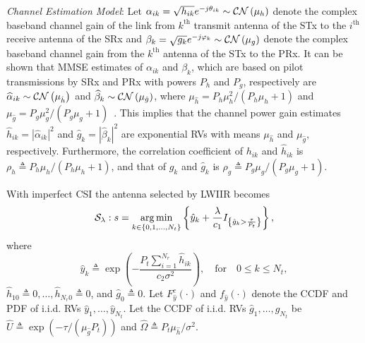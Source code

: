 \documentclass[12pt,draftcls,peerreview,onecolumn]{IEEEtran}
\newcommand{\cbrac}[1]{\left\{{#1}\right\}}
\newcommand{\indic}[1]{I_{\cbrac{#1}}}
\newcommand{\CN}{{\cal CN}}
\newcommand{\define}{\triangleq}
\DeclareMathOperator*{\argmin}{arg\,min}
\newcommand{\nx}{{0}}
\newcommand{\lam}{\lambda}
\newcommand{\lamstar}{\lam^{*}}
\newcommand{\mug}{{\mu_{g}}}
\newcommand{\muh}{{\mu_{h}}}
\newcommand{\Nt}{{N_t}}
\newcommand{\Nr}{{N_r}}
\newcommand{\Pt}{{P_t}}
\newcommand{\such}{h}
\newcommand{\puch}{g}
\newcommand{\hk}[1]{{\such_{#1}}}
\newcommand{\gk}[1]{{\puch_{#1}}}
\newcommand{\noisevar}{\sigma^2}
\newcommand{\outmax}{O_{\text{max}}}
\newcommand{\itau}{\tau}
\newcommand{\cone}{c_{1}}
\newcommand{\ctwo}{c_{2}}
\newcommand{\out}{O}
\newcommand{\m}{\cone}
\newcommand{\taubypt}{\frac{\itau}{\Pt}}
\newcommand{\gkhatgrtaubypt}[1]{{\gkhat{#1}}>\taubypt}
\newcommand{\ghatindic}[1]{\indic{\gkhatgrtaubypt{#1}}}
\newcommand{\lambym}{\frac{\lam}{\m}}
\newcommand{\lamstarbym}{\frac{\lamstar}{\m}}
\newcommand{\ykhatplusgkhat}[1]{ \ykhat{#1} + \lambym\ghatindic{#1}}
\newcommand{\al}{\ctwo}
\newcommand{\snr}{\Omega}
\newcommand{\albysnr}[1][]{\frac{\al#1}{\snr}}
\newcommand{\un}{U}
\newcommand{\allopts}{\left\{\nx,1,\ldots,\Nt\right\}}
\newcommand{\suchph}{\theta}
\newcommand{\puchph}{\varphi}
\newcommand{\ith}{i^{\text{th}}}
\newcommand{\kth}{k^{\text{th}}}
\newcommand{\callamrule}{{\cal S_{{\lam}}}}
\newcommand{\outlam}{\out_{\lam}}
\newcommand{\sug}{\alpha}
\newcommand{\pug}{\beta}
\newcommand{\sugain}[1]{\sug_{#1}}
\newcommand{\pugain}[1]{\pug_{#1}}
\newcommand{\sugainhat}[1]{\widehat{\sug}_{#1}}
\newcommand{\pugainhat}[1]{\widehat{\pug}_{#1}}
\newcommand{\unhat}{\widehat{\un}}
\newcommand{\snrhat}{\widehat{\snr}}
\newcommand{\gpilotpower}{P_g}
\newcommand{\hpilotpower}{P_h}
\newcommand{\hhat}{\hat{\such}}
\newcommand{\ghat}{\hat{\puch}}
\newcommand{\yhat}{\hat{y}}
\newcommand{\hkhat}[1]{\hhat_{#1}}
\newcommand{\gkhat}[1]{\ghat_{#1}}
\newcommand{\ykhat}[1]{\hat{y}_{#1}}
\newcommand{\muhhat}{\mu_{\hhat}}
\newcommand{\mughat}{\mu_{\ghat}}
\newcommand{\ccdfghatinline}{\exp\left( {-{\itau}/{\left( \mughat\Pt\right) }}\right) }
\newcommand{\rhog}{\rho_g}
\newcommand{\rhoh}{\rho_h}
\newcommand{\ccdfyhatrv}[1]{F^{c}_{\yhat}\left(#1 \right) }
\begin{document}
{\em Channel Estimation Model}: Let $\sugain{ik} = \sqrt{\hk{ik}}e^{-j\suchph_{ik}}\sim\CN\left(\muh\right) $ denote the complex baseband channel gain of the link from $\kth$ transmit antenna of the STx to the $\ith$ receive antenna of the SRx and $\pugain{k} = \sqrt{\gk{k}}e^{-j\puchph_{k}}\sim\CN\left(\mug\right)$ denote the complex baseband channel gain from the $\kth$ antenna of the STx to the PRx.  It can be shown that MMSE estimates of $\sugain{ik}$ and $\pugain{k}$, which are based on pilot transmissions by SRx and PRx with powers $\hpilotpower$ and $\gpilotpower$, respectively are  $\sugainhat{ik}\sim\CN\left(\muhhat \right)$ and $\pugainhat{k}\sim \CN\left(\mughat\right) $, where  $\muhhat ={\hpilotpower\mu^2_{\such}}/{\left( \hpilotpower\muh+1\right)}$ and $\mughat = {\gpilotpower\mu^2_{\puch}}/{\left( \gpilotpower\mug+1\right)}$~\cite{Kashyap_2014_TCOM}.  
This implies that the channel power gain estimates $\hkhat{ik}=|\sugainhat{ik}|^2$ and $\gkhat{k}=|\pugainhat{k}|^2$ are exponential RVs with means $\muhhat$ and $\mughat$, respectively. Furthermore, the correlation coefficient  of $\hk{ik}$ and $\hkhat{ik}$ is $\rhoh\define{\hpilotpower\muh}/{\left( \hpilotpower\muh + 1\right) }$, and that of $\gk{k}$ and $\gkhat{k}$ is $\rhog \define{\gpilotpower\mug}/{\left( \gpilotpower\mug + 1\right) }$. 


With imperfect CSI the antenna selected by LWIIR becomes 
\begin{equation}
\callamrule: s=\argmin\limits_{k\in\allopts} \left\{ \ykhatplusgkhat{k} \right\},
\label{eq:shat}
\end{equation}
where 
\begin{equation}
\ykhat{k} \define  \exp\left({- \frac{\Pt\sum_{i=1}^{\Nr}\hkhat{ik}}{\ctwo\noisevar} }\right), \quad \text{for} \quad 0\leq k \leq\Nt,
\label{eq:yihat_def}
\end{equation}
$\hkhat{1\nx} \define 0,\ldots,\hkhat{\Nr\nx} \define 0$, and $\gkhat{\nx}   \define 0$. Let $F_{\yhat}^{c}(\cdot)$ and $f_{\yhat}(\cdot)$ denote the CCDF and PDF of i.i.d. RVs $\ykhat{1},\dots,\ykhat{\Nt}$. Let the CCDF of i.i.d. RVs $\gkhat{1},\ldots,\gkhat{\Nt}$ be $\unhat\define\ccdfghatinline$ and  $\snrhat\define{\Pt\muhhat}/{\noisevar}$.  


\newcommand{\D}{D}
\newcommand{\pdfyhatNr}{\left(\ln\left(\frac{1}{x}\right)\right)^{\Nr-1}x^{\albysnr[]-1}} %
\newcommand{\yhattimespdfyNr}{\left[-\ln\left(x\right)\right]^{\Nr-1}x^{\D}} %
\newcommand{\yhatpluslamstartimespdfyNr}{\left[-\ln\left({x+\lamstarbym}\right)\right]^{\Nr-1}\left(x+\lamstarbym\right)^{\D}} %
\newcommand{\yhatpluslamtimespdfyNr}{\left[-\ln\left({x+\lambym}\right)\right]^{\Nr-1}\left(x+\lambym\right)^{\D}} %
\newcommand{\unccdfyhat}[2]{{#1}\,\,\ccdfyhatrv{#2}}
\end{document}
